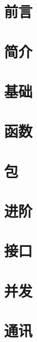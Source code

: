 \documentclass[a4paper,twoside,openleft]{blocksbook}
\begin{document}
\begin{cjkc}
\chapter*{前言}
\label{chap:preface}


\chapter{简介}
\label{chap:intro}


\chapter{基础}
\label{chap:basics}


\chapter{函数}
\label{chap:functions}


\chapter{包}
\label{chap:packages}


\chapter{进阶}
\label{chap:beyond}


\chapter{接口}
\label{chap:interfaces}


\chapter{并发}
\label{chap:channels}


\chapter{通讯}
\label{chap:communication}




\end{cjkc}
\end{document}
